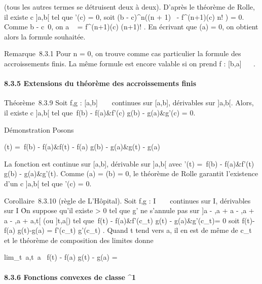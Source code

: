 (tous les autres termes se détruisent deux à deux). D'après le théorème
de Rolle, il existe c \in]a,b[ tel que \phi'(c) = 0, soit (b -
c)^n\left ((n + 1)\lambda~ - f^(n+1)(c)
\over n! \right ) = 0. Comme b -
c\neq~0, on a \lambda~ = f^(n+1)(c)
\over (n+1)! . En écrivant que \phi(a) = 0, on obtient
alors la formule souhaitée.

Remarque~8.3.1 Pour n = 0, on trouve comme cas particulier la formule
des accroissements finis. La même formule est encore valable si on prend
f : [b,a] \rightarrow~ ~.

\paragraph{8.3.5 Extensions du théorème des accroissements finis}

Théorème~8.3.9 Soit f,g : [a,b] \rightarrow~ ~ continues sur [a,b],
dérivables sur ]a,b[. Alors, il existe c \in]a,b[ tel que
\left
\matrix\,f(b) - f(a)&f'(c)
\cr g(b) - g(a)&g'(c)\right 
= 0.

Démonstration Posons

\phi(t) = \left
\matrix\,f(b) - f(a)&f(t) -
f(a) \cr g(b) - g(a)&g(t) - g(a)\right


La fonction \phi est continue sur [a,b], dérivable sur ]a,b[ avec
\phi'(t) = \left
\matrix\,f(b) - f(a)&f'(t)
\cr g(b) - g(a)&g'(t)\right .
Comme \phi(a) = \phi(b) = 0, le théorème de Rolle garantit l'existence d'un c
\in]a,b[ tel que \phi'(c) = 0.

Corollaire~8.3.10 (règle de L'Hôpital). Soit f,g : I \rightarrow~ ~ continues sur
I, dérivables sur I \diagdown\a\. On suppose
qu'il existe \eta > 0 tel que g' ne s'annule pas sur ]a -
\eta,a + a - \eta,a +
a - \eta,a +
a,t[ (ou ]t,a[) tel que \left
\matrix\,f(t) -
f(a)&f'(c_t) \cr g(t) -
g(a)&g'(c_t)\right  = 0 soit 
f(t)-f(a) \over g(t)-g(a) = f'(c_t)
\over g'(c_t) . Quand t tend vers a, il en est
de même de c_t et le théorème de composition des limites donne

lim_t\rightarrow~a,t\neq~a~
f(t) - f(a) \over g(t) - g(a) = \ell

\paragraph{8.3.6 Fonctions convexes de classe ^1}

